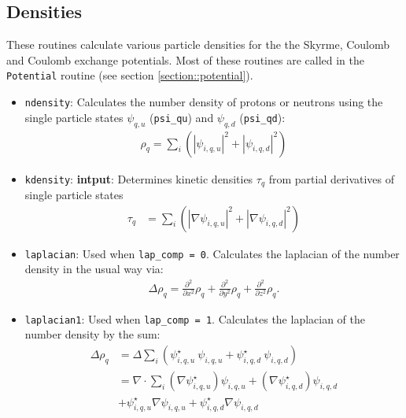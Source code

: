 \documentclass[4p]{elsarticle}
\begin{document}
\subsection{Densities}
\label{section::densities}
These routines calculate various particle densities for the the Skyrme, Coulomb and Coulomb exchange potentials. Most of these routines are called in the \texttt{Potential} routine (see section \ref{section::potential}).
\begin{itemize}
\item \texttt{ndensity}: Calculates the number density of protons or neutrons using the single particle states $\psi_{q,u}$ (\texttt{psi\_qu}) and $\psi_{q,d}$ (\texttt{psi\_qd}):
\begin{align}
\rho_q = \sum\nolimits_i \left( | \psi_{i,q,u} |^2 +  | \psi_{i,q,d} |^2 \right) 
\end{align}
\item \texttt{kdensity}: \textbf{intput}: Determines kinetic densities $\tau_q$ from partial derivatives of single particle states
\begin{align}
\tau_q &= \sum\nolimits_i \left( | \nabla \psi_{i,q,u} |^2  +  | \nabla \psi_{i,q,d} |^2 \right) 
\end{align}
\item \texttt{laplacian}: Used when \texttt{lap\_comp = 0}. Calculates the laplacian of the number density in the usual way via:
\begin{align}
\Delta \rho_q = \frac{\partial^2}{\partial x^2} \rho_q + \frac{\partial^2}{\partial y^2} \rho_q + \frac{\partial^2}{\partial z^2} \rho_q .  
\label{lap_simple}
\end{align}
\item \texttt{laplacian1}: Used when \texttt{lap\_comp = 1}. Calculates the laplacian of the number density by the sum:
\begin{align}
\Delta \rho_q &= \Delta \sum\nolimits_i \left( \psi^{\star}_{i,q,u} \: \psi_{i,q,u} +  \psi^{\star}_{i,q,d} \: \psi_{i,q,d} \right) \nonumber\\
                      &= \nabla \cdot \sum\nolimits_i  \left( \nabla  \psi^{\star}_{i,q,u} \right) \psi_{i,q,u} +  \left( \nabla  \psi^{\star}_{i,q,d} \right) \psi_{i,q,d}  \nonumber\\
                      &+ \psi^{\star}_{i,q,u} \nabla \psi_{i,q,u} +  \psi^{\star}_{i,q,d} \nabla  \psi_{i,q,d}

\end{align}
\end{itemize}
\end{document}

